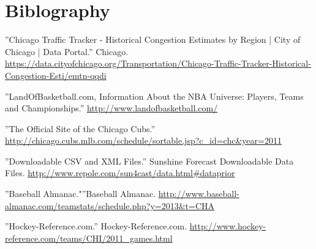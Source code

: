 \documentclass[12pt]{article}
\begin{document}
\section{Biblography}
\begin{thebibliography}{9}

	''Chicago Traffic Tracker - Historical Congestion Estimates by Region | City of Chicago | Data Portal.'' Chicago. \url{https://data.cityofchicago.org/Transportation/Chicago-Traffic-Tracker-Historical-Congestion-Esti/emtn-qqdi}
  
	''LandOfBasketball.com, Information About the NBA Universe: Players, Teams and Championships.'' \url{http://www.landofbasketball.com/}

  ''The Official Site of the Chicago Cubs.'' \url{http://chicago.cubs.mlb.com/schedule/sortable.jsp?c_id=chc&year=2011}

  ''Downloadable CSV and XML Files.'' Sunshine Forecast Downloadable Data Files.
  \url{http://www.repole.com/sun4cast/data.html#dataprior}
	
  ''Baseball Almanac."''Baseball Almanac. \url{http://www.baseball-almanac.com/teamstats/schedule.php?y=2013&t=CHA}

  ''Hockey-Reference.com.'' Hockey-Reference.com. \url{http://www.hockey-reference.com/teams/CHI/2011_games.html}
\end{thebibliography}
\end{document}
